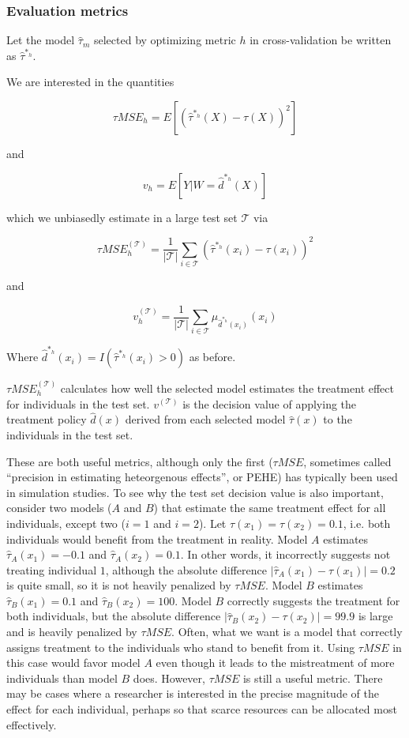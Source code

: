 \subsubsection{Evaluation metrics}

Let the model $\hat\tau_m$ selected by optimizing metric $h$ in cross-validation be written as $\hat\tau^{*_h}$. 

We are interested in the quantities

\[
\tau MSE_h = E[ (\hat\tau^{*_h} (X) - \tau(X))^2 ]
\]

and 

\[
v_h = E[ Y| W =\hat d^{*_h} (X)]
\]

which we unbiasedly estimate in a large test set $\mathcal{T}$ via

\begin{equation}
\label{true-mse}
\tau MSE^{(\mathcal{T})}_h = \frac{1}{|\mathcal{T}|}\sum_{i \in \mathcal{T}} (\hat\tau^{*_h} (x_i) - \tau(x_i))^2
\end{equation}

and 

\begin{equation}
\label{true-value}
v^{(\mathcal{T})}_h = \frac{1}{|\mathcal{T}|}\sum_{i \in \mathcal{T}} \mu_{\hat d^{*_h}(x_i)}(x_i)
\end{equation}

Where $\hat d^{*_h}(x_i) = I(\hat\tau^{*_h}(x_i) > 0)$ as before. 

$\tau MSE_{h}^{(\mathcal{T})}$ calculates how well the selected model estimates the treatment effect for individuals in the test set. $v^{(\mathcal{T})}$ is the decision value of applying the treatment policy $\hat d(x)$ derived from each selected model $\hat \tau (x)$ to the individuals in the test set.

These are both useful metrics, although only the first ($\tau MSE$, sometimes called ``precision in estimating heteorgenous effects'', or PEHE) has typically been used in simulation studies. To see why the test set decision value is also important, consider two models ($A$ and $B$) that estimate the same treatment effect for all individuals, except two ($i=1$ and $i=2$). Let $\tau(x_1) = \tau(x_2) = 0.1$, i.e. both individuals would benefit from the treatment in reality. Model $A$ estimates $\hat\tau_A(x_1) = -0.1$ and $\hat\tau_A(x_2) = 0.1$. In other words, it incorrectly suggests not treating individual $1$, although the absolute difference $|\hat\tau_A(x_1)-\tau(x_1)| = 0.2$ is quite small, so it is not heavily penalized by $\tau MSE$. Model $B$ estimates $\hat\tau_B(x_1) = 0.1$ and $\hat\tau_B(x_2) = 100$. Model $B$ correctly suggests the treatment for both individuals, but the absolute difference $|\hat\tau_B(x_2)-\tau(x_2)| = 99.9$ is large and is heavily penalized by $\tau MSE$. Often, what we want is a model that correctly assigns treatment to the individuals who stand to benefit from it. Using $\tau MSE$ in this case would favor model $A$ even though it leads to the mistreatment of more individuals than model $B$ does. However, $\tau MSE$ is still a useful metric. There may be cases where a researcher is interested in the precise magnitude of the effect for each individual, perhaps so that scarce resources can be allocated most effectively. 

